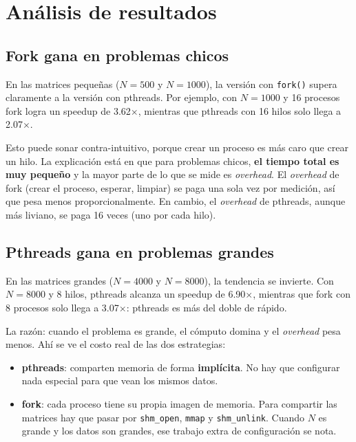 \section{Análisis de resultados}

\subsection{Fork gana en problemas chicos}

En las matrices pequeñas ($N = 500$ y $N = 1000$), la versión con \texttt{fork()} supera claramente a la versión con pthreads. Por ejemplo, con $N = 1000$ y 16 procesos fork logra un speedup de 3.62$\times$, mientras que pthreads con 16 hilos solo llega a 2.07$\times$.

Esto puede sonar contra-intuitivo, porque crear un proceso es más caro que crear un hilo. La explicación está en que para problemas chicos, \textbf{el tiempo total es muy pequeño} y la mayor parte de lo que se mide es \textit{overhead}. El \textit{overhead} de fork (crear el proceso, esperar, limpiar) se paga una sola vez por medición, así que pesa menos proporcionalmente. En cambio, el \textit{overhead} de pthreads, aunque más liviano, se paga 16 veces (uno por cada hilo).

\subsection{Pthreads gana en problemas grandes}

En las matrices grandes ($N = 4000$ y $N = 8000$), la tendencia se invierte. Con $N = 8000$ y 8 hilos, pthreads alcanza un speedup de 6.90$\times$, mientras que fork con 8 procesos solo llega a 3.07$\times$: pthreads es más del doble de rápido.

La razón: cuando el problema es grande, el cómputo domina y el \textit{overhead} pesa menos. Ahí se ve el costo real de las dos estrategias:

\begin{itemize}
    \item \textbf{pthreads}: comparten memoria de forma \textbf{implícita}. No hay que configurar nada especial para que vean los mismos datos.
    \item \textbf{fork}: cada proceso tiene su propia imagen de memoria. Para compartir las matrices hay que pasar por \texttt{shm\_open}, \texttt{mmap} y \texttt{shm\_unlink}. Cuando $N$ es grande y los datos son grandes, ese trabajo extra de configuración se nota.
\end{itemize}

